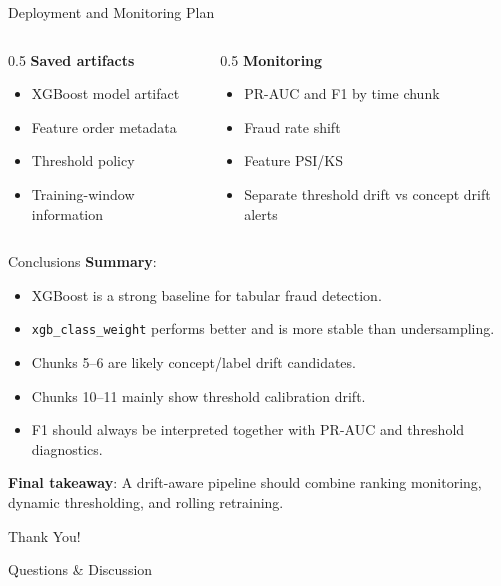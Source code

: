 \documentclass{beamer}
\begin{document}
\begin{frame}{Deployment and Monitoring Plan}
    \begin{columns}
        \begin{column}{0.5\textwidth}
            \textbf{Saved artifacts}
            \begin{itemize}
                \item XGBoost model artifact
                \item Feature order metadata
                \item Threshold policy
                \item Training-window information
            \end{itemize}
        \end{column}
        \begin{column}{0.5\textwidth}
            \textbf{Monitoring}
            \begin{itemize}
                \item PR-AUC and F1 by time chunk
                \item Fraud rate shift
                \item Feature PSI/KS
                \item Separate threshold drift vs concept drift alerts
            \end{itemize}
        \end{column}
    \end{columns}
\end{frame}

\begin{frame}{Conclusions}
    \textbf{Summary}:
    \begin{itemize}
        \item XGBoost is a strong baseline for tabular fraud detection.
        \item \texttt{xgb\_class\_weight} performs better and is more stable than undersampling.
        \item Chunks 5--6 are likely concept/label drift candidates.
        \item Chunks 10--11 mainly show threshold calibration drift.
        \item F1 should always be interpreted together with PR-AUC and threshold diagnostics.
    \end{itemize}

    \vspace{0.4cm}
    \textbf{Final takeaway}: A drift-aware pipeline should combine ranking monitoring, dynamic thresholding, and rolling retraining.
\end{frame}

\begin{frame}
    \centering
    \Huge Thank You!

    \vspace{1cm}

    \Large Questions \& Discussion
\end{frame}
\end{document}
